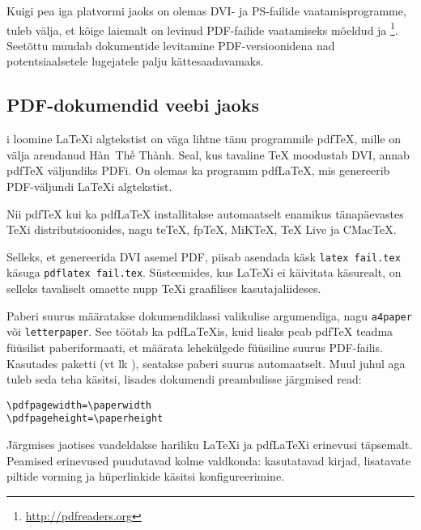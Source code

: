 Kuigi pea iga platvormi jaoks on olemas DVI- ja PS-failide
vaatamisprogramme, tuleb välja, et kõige laiemalt on levinud
PDF-failide vaatamiseks mõeldud  ja
\footnote{\url{http://pdfreaders.org}}. Seetõttu muudab
dokumentide levitamine PDF-versioonidena nad potentsiaalsetele
lugejatele palju kättesaadavamaks.

\subsection{PDF-dokumendid veebi jaoks}

i loomine \LaTeX i algtekstist on väga lihtne tänu
programmile pdf\TeX{}, mille on välja arendanud
H\`an~Th\'{\^e} Th\`anh. Seal, kus
tavaline \TeX{} moodustab DVI, annab pdf\TeX{} väljundiks PDFi. On
olemas ka programm pdf\LaTeX, mis genereerib
PDF-väljundi \LaTeX i algtekstist.

Nii pdf\TeX{} kui ka pdf\LaTeX{} installitakse automaatselt enamikus
tänapäevastes \TeX i distributsioonides, nagu
te\TeX{}, fp\TeX{},
MiK\TeX, \TeX{} Live ja
CMac\TeX{}.

Selleks, et genereerida DVI asemel PDF, piisab asendada käsk
\texttt{latex fail.tex} käsuga \texttt{pdflatex fail.tex}. Süsteemides,
kus \LaTeX i ei käivitata käsurealt, on selleks tavaliselt omaette nupp
\TeX i graafilises kasutajaliideses.

Paberi suurus määratakse dokumendiklassi valikulise argumendiga, nagu
\texttt{a4paper} või \texttt{letterpaper}. See töötab ka pdf\LaTeX is,
kuid lisaks peab pdf\TeX{} teadma füüsilist paberiformaati, et määrata
lehekülgede füüsiline suurus PDF-failis. Kasutades
paketti  (vt lk \pageref{ssec:pdfhyperref}), seatakse
paberi suurus automaatselt. Muul juhul aga tuleb seda teha käsitsi,
lisades dokumendi preambulisse järgmised read:
\begin{code}
\begin{verbatim}
\pdfpagewidth=\paperwidth
\pdfpageheight=\paperheight
\end{verbatim}
\end{code}

Järgmises jaotises vaadeldakse hariliku \LaTeX i ja pdf\LaTeX i erinevusi
täpsemalt. Peamised erinevused puudutavad kolme valdkonda: kasutatavad
kirjad, lisatavate piltide vorming ja hüperlinkide käsitsi
konfigureerimine.

